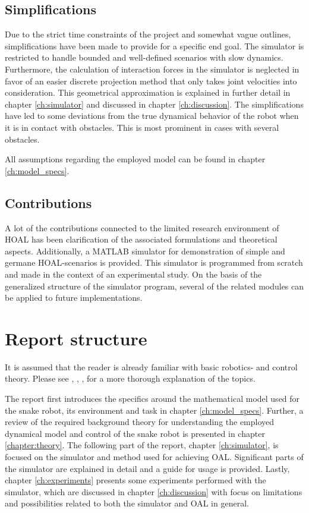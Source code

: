 \subsection{Simplifications}
Due to the strict time constraints of the project and somewhat vague outlines, simplifications have been made to provide for a specific end goal. The simulator is restricted to handle bounded and well-defined scenarios with slow dynamics. Furthermore, the calculation of interaction forces in the simulator is neglected in favor of an easier discrete projection method that only takes joint velocities into consideration. This geometrical approximation is explained in further detail in chapter \ref{ch:simulator} and discussed in chapter \ref{ch:discussion}. The simplifications have led to some deviations from the true dynamical behavior of the robot when it is in contact with obstacles. This is most prominent in cases with several obstacles.

All assumptions regarding the employed model can be found in chapter \ref{ch:model_specs}.

\subsection{Contributions}
A lot of the contributions connected to the limited research environment of HOAL has been clarification of the associated formulations and theoretical aspects. Additionally, a MATLAB simulator for demonstration of simple and germane HOAL-scenarios is provided.
This simulator is programmed from scratch and made in the context of an experimental study. On the basis of the generalized structure of the simulator program, several of the related modules can be applied to future implementations.


\section{Report structure}
It is assumed that the reader is already familiar with basic robotics- and control theory. Please see \cite{lynch2017modern}, \cite{lynch2017modernCompTorque}, \cite{waldron2016kinematics}, \cite{liljeback2012snake} for a more thorough explanation of the topics.

The report first introduces the specifics around the mathematical model used for the snake robot, its environment and task in chapter \ref{ch:model_specs}. Further, a review of the required background theory for understanding the employed dynamical model and control of the snake robot is presented in chapter \ref{chapter:theory}. The following part of the report, chapter \ref{ch:simulator}, is focused on the simulator and method used for achieving OAL. Significant parts of the simulator are explained in detail and a guide for usage is provided. Lastly, chapter \ref{ch:experiments} presents some experiments performed with the simulator, which are discussed in chapter \ref{ch:discussion} with focus on limitations and possibilities related to both the simulator and OAL in general.